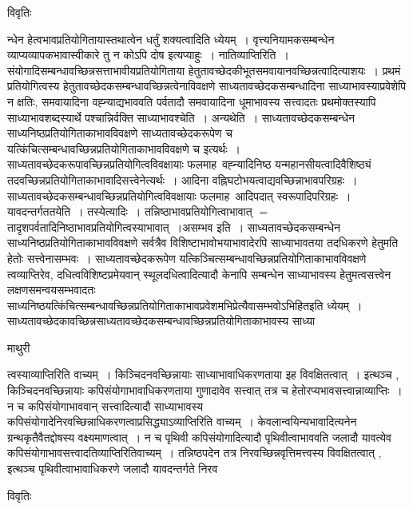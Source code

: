 \documentclass[10pt, openany]{book}
\begin{document}
{\begin{center}     विवृतिः \end{center}
न्धेन हेत्वभावप्रतियोगितायास्तथात्वेन धर्तुं शक्यत्वादिति ध्येयम्~। वृत्त्यनियामकसम्बन्धेन व्याप्यव्यापकभावास्वीकारे तु न कोऽपि दोष इत्यप्याहुः~। {\qt नातिव्याप्तिरिति~।} संयोगादिसम्बन्धावच्छिन्नसत्ताभावीयप्रतियोगिताया हेतुतावच्छेदकीभूतसमवायानवच्छिन्नत्वादित्याशयः~। प्रथमं प्रतियोगित्वस्य हेतुतावच्छेदकसम्बन्धावच्छिन्नत्वेनाविवक्षणे साध्यतावच्छेदकसम्बन्धादिना साध्याभावस्याप्रवेशेपि न क्षतिः, समवायादिना वह्न्याद्यभाववति पर्वतादौ समवायादिना धूमाभावस्य सत्त्वादतः प्रथमोक्तस्यापि साध्याभावशब्दस्यार्थे पश्चान्निर्वक्ति {\qt साध्याभावश्चेति~।} अन्यथेति~। साध्यतावच्छेदकसम्बन्धेन साध्यनिष्ठप्रतियोगिताकाभावविवक्षणे साध्यतावच्छेदकरूपेण च यत्किंचित्सम्बन्धावच्छिन्नप्रतियोगिताकाभावविवक्षणे च इत्यर्थः~। साध्यतावच्छेदकरूपावच्छिन्नप्रतियोगित्वविवक्षायाः फलमाह~वह्न्यादिनिष्ठ  यन्महानसीयत्वादिवैशिष्ठ्यं तदवच्छिन्नप्रतियोगिताकाभावादिसत्त्वेनेत्यर्थः~। आदिना वह्निघटोभयत्वाद्यवच्छिन्नाभावपरिग्रहः~।
साध्यतावच्छेदकसम्बन्धावच्छिन्नप्रतियोगित्वविवक्षायाः फलमाह~आदिपदात् स्वरूपादिपरिग्रहः~। यावदन्तर्गततयेति~। तस्येत्यादिः~।
तन्निष्ठाभावप्रतियोगित्वाभावात् $=$ तादृशपर्वतादिनिष्ठाभावप्रतियोगित्वस्याभावात्~।असम्भव इति~। साध्यतावच्छेदकसम्बन्धेन साध्यनिष्ठप्रतियोगिताकाभावविवक्षणे सर्वत्रैव
विशिष्टाभावोभयाभावादेरपि साध्याभावतया तदधिकरणे हेतुमति हेतोः सत्त्वेनासम्भवः~। साध्यतावच्छेदकरूपेण यत्किञ्चित्सम्बन्धावच्छिन्नप्रतियोगिताकाभावविवक्षणे
त्वव्याप्तिरेव, दधित्वविशिष्टप्रमेयवान् स्थूलदधित्वादित्यादौ केनापि सम्बन्धेन साध्याभावस्य हेतुमत्वसत्त्वेन लक्षणसमन्वयसम्भवादतः
साध्यनिष्ठयत्किंचित्सम्बन्धावच्छिन्नप्रतियोगिताकाभावप्रवेशमभिप्रेत्यैवासम्भवोऽभिहितइति ध्येयम्~।साध्यतावच्छेदकावच्छिन्नसाध्यतावच्छेदकसम्बन्धावच्छिन्नप्रतियोगिताकाभावस्य साध्या
\newpage
\begin{center}  माथुरी  \end{center}
{\la त्वस्याव्याप्तिरिति वाच्यम्~। किञ्चिदनवच्छिन्नायाः साध्याभावाधिकरणताया इह विवक्षितत्वात्~। इत्थञ्च , किञ्चिदनवच्छिन्नायाः कपिसंयोगाभावाधिकरणताया गुणादावेव सत्त्वात् तत्र च हेतोरप्यभावसत्त्वान्नाव्याप्तिः~। न च कपिसंयोगाभाववान् सत्त्वादित्यादौ साध्याभावस्य कपिसंयोगादेनिरवच्छिन्नाधिकरणत्वाप्रसिद्ध्याऽव्याप्तिरिति वाच्यम्~। केवलान्वयिन्यभावादित्यनेन ग्रन्थकृतैवैतद्दोषस्य वक्ष्यमाणत्वात्~। न च पृथिवी कपिसंयोगादित्यादौ पृथिवीत्वाभाववति जलादौ यावत्येव कपिसंयोगाभावसत्त्वादतिव्याप्तिरितिवाच्यम्~। तन्निष्ठपदेन तत्र निरवच्छिन्नवृत्तिमत्त्वस्य विवक्षितत्वात् , इत्थञ्च पृथिवीत्वाभावाधिकरणे जलादौ यावदन्तर्गते निरव}
\begin{center}     विवृतिः \end{center}
}
\end{document}
